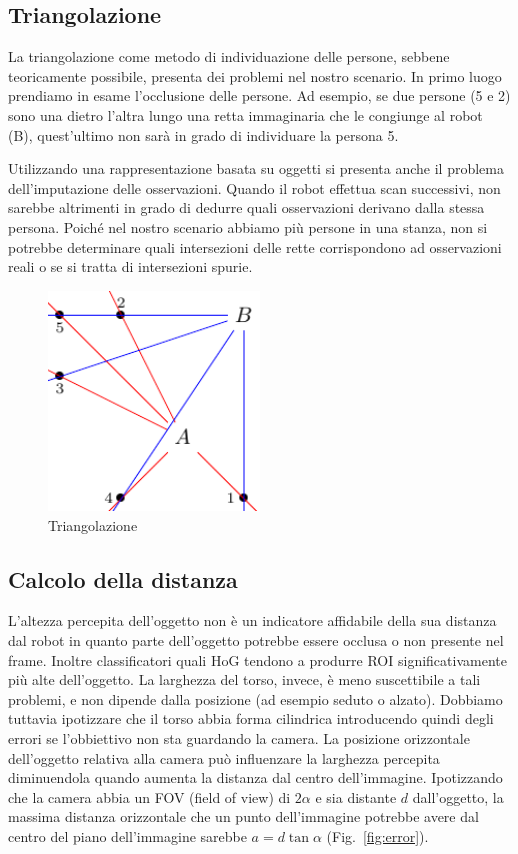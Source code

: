 \documentclass[a4paper]{article}
\begin{document}
	
	\subsection{Triangolazione}\label{subsec:Triangolazione}
	La triangolazione come metodo di individuazione delle persone, sebbene
	teoricamente possibile, presenta dei problemi nel nostro scenario. In primo
	luogo prendiamo in esame l'occlusione delle persone. Ad esempio, se due
	persone (5 e 2) sono una dietro l'altra lungo una retta immaginaria che le
	congiunge al robot (B), quest'ultimo non sarà in grado di individuare la
	persona 5. 
	
	Utilizzando una rappresentazione basata su oggetti si presenta anche il
	problema dell'imputazione delle osservazioni. Quando il robot effettua scan
	successivi, non sarebbe altrimenti in grado di dedurre quali osservazioni
	derivano dalla stessa persona.  Poiché nel nostro scenario abbiamo più
	persone in una stanza, non si potrebbe determinare quali intersezioni delle
	rette corrispondono ad osservazioni reali o se si tratta di intersezioni
	spurie. 
	
	\begin{figure}[H]
		\centering
		\includegraphics[width=0.5\textwidth]{./img/ideal_object_triangulation.pdf}
		\caption{Triangolazione}
		\label{fig:triangulation}
	\end{figure}
	
	\subsection{Calcolo della distanza}\label{subsec:Calcolo-della-distanza}
	L'altezza percepita dell'oggetto non è un indicatore affidabile della sua distanza dal robot in quanto parte dell'oggetto potrebbe essere occlusa o non presente nel frame. Inoltre classificatori quali HoG tendono a produrre ROI significativamente più alte dell'oggetto. La larghezza del torso, invece, è meno suscettibile a tali problemi, e non dipende dalla posizione (ad esempio seduto o alzato). Dobbiamo tuttavia ipotizzare che il torso abbia forma cilindrica introducendo quindi degli errori se l'obbiettivo non sta guardando la camera.	La posizione orizzontale dell'oggetto relativa alla camera può influenzare la larghezza percepita diminuendola quando aumenta la distanza dal centro dell'immagine. Ipotizzando che la camera abbia un FOV (field of view) di $2\alpha$ e sia distante $d$ dall'oggetto, la massima distanza orizzontale che un punto dell'immagine potrebbe avere dal centro del piano dell'immagine sarebbe $a = d \tan \alpha$ (Fig.~\ref{fig:error}).
	
\end{document}
